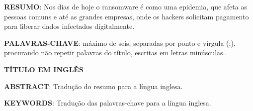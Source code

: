 \vspace{0.5cm}
\noindent\textbf{RESUMO}: Nos dias de hoje o ransomware é como uma epidemia, que afeta as pessoas comuns e até as grandes empresas, 
onde os hackers solicitam pagamento para liberar dados infectados digitalmente.  


\vspace{0.5cm}
\noindent\textbf{PALAVRAS-CHAVE}: máximo de seis, separadas por ponto e vírgula (;), procurando não repetir palavras do 
título, escritas em letras minúsculas.. \cite{cloudflare_prevent}

\vspace{0.5cm}
\begin{center}
\textbf{TÍTULO EM INGLÊS}
\end{center}

\noindent\textbf{ABSTRACT}: Tradução do resumo para a língua inglesa.

\vspace{0.5cm}
\noindent\textbf{KEYWORDS}: Tradução das palavras-chave para a língua inglesa.